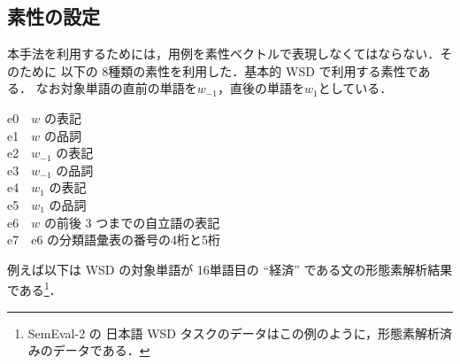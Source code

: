 \documentclass[japanese]{jnlp_1.4}
\begin{document}
\subsection{素性の設定}

本手法を利用するためには，用例を素性ベクトルで表現しなくてはならない．そのために
以下の 8種類の素性を利用した．基本的 WSD で利用する素性である．
なお対象単語の直前の単語を\( w_{-1}\)，直後の単語を\( w_1 \)としている．

{\setlength{\leftskip}{4zw}
\noindent
e0　\( w \) の表記\\
e1　\( w \) の品詞\\
e2　\( w_{-1} \) の表記\\
e3　\( w_{-1} \) の品詞\\
e4　\( w_1 \) の表記\\
e5　\( w_1 \) の品詞\\
e6　\( w \) の前後 3 つまでの自立語の表記\\
e7　e6 の分類語彙表の番号の4桁と5桁\par
}

例えば以下は WSD の対象単語が 16単語目の \mbox{``経済''} である文の形態素解析結果である\footnote{SemEval-2 の
日本語 WSD タスクのデータはこの例のように，形態素解析済みのデータである．}．
\end{document}
